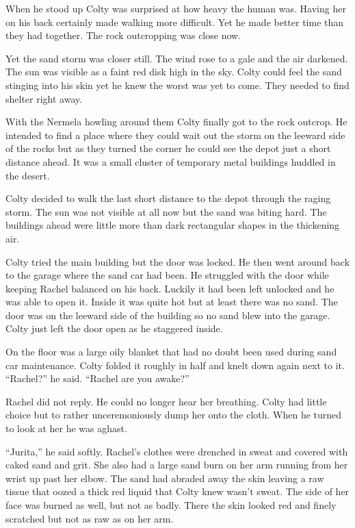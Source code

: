 When he stood up Colty was surprised at how heavy the human was. Having her on his back
certainly made walking more difficult. Yet he made better time than they had together. The rock
outcropping was close now.

Yet the sand storm was closer still. The wind rose to a gale and the air darkened. The sun was
visible as a faint red disk high in the sky. Colty could feel the sand stinging into his skin
yet he knew the worst was yet to come. They needed to find shelter right away.

With the Nermela howling around them Colty finally got to the rock outcrop. He intended to find
a place where they could wait out the storm on the leeward side of the rocks but as they turned
the corner he could see the depot just a short distance ahead. It was a small cluster of
temporary metal buildings huddled in the desert.

Colty decided to walk the last short distance to the depot through the raging storm. The sun was
not visible at all now but the sand was biting hard. The buildings ahead were little more than
dark rectangular shapes in the thickening air.

Colty tried the main building but the door was locked. He then went around back to the garage
where the sand car had been. He struggled with the door while keeping Rachel balanced on his
back. Luckily it had been left unlocked and he was able to open it. Inside it was quite hot but
at least there was no sand. The door was on the leeward side of the building so no sand blew
into the garage. Colty just left the door open as he staggered inside.

On the floor was a large oily blanket that had no doubt been used during sand car maintenance.
Colty folded it roughly in half and knelt down again next to it. ``Rachel?'' he said. ``Rachel
are you awake?''

Rachel did not reply. He could no longer hear her breathing. Colty had little choice but to
rather unceremoniously dump her onto the cloth. When he turned to look at her he was aghast.

``Jurita,'' he said softly. Rachel's clothes were drenched in sweat and covered with caked sand
and grit. She also had a large sand burn on her arm running from her wrist up past her elbow.
The sand had abraded away the skin leaving a raw tissue that oozed a thick red liquid that Colty
knew wasn't sweat. The side of her face was burned as well, but not as badly. There the skin
looked red and finely scratched but not as raw as on her arm.

